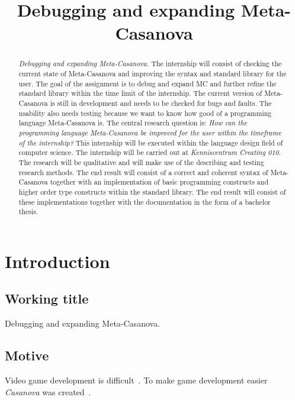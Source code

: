 



\title{Debugging and expanding Meta-Casanova}
\author{\writer}

\begin{titlepage}
   
\end{titlepage}

\begin{abstract}
   \emph{Debugging and expanding Meta-Casanova.}
   The internship will consist of checking the current state of Meta-Casanova and improving the syntax and standard library for the user.
The goal of the assignment is to debug and expand MC and further refine the standard library within the time limit of the internship.
The current version of Meta-Casanova is still in development and needs to be checked for bugs and faults.
The usability also needs testing because we want to know how good of a programming language Meta-Casanova is.
The central research question is: \emph{How can the programming language Meta-Casanova be improved for the user within the timeframe of the internship?}
This internship will be executed within the language design field of computer science.
The internship will be carried out at \emph{Kenniscentrum Creating 010}.
The research will be qualitative and will make use of the describing and testing research methods.
The end result will consist of a correct and coherent syntax of Meta-Casanova together with an implementation of basic programming constructs and higher order type constructs within the standard library.
The end result will consist of these implementations together with the documentation in the form of a bachelor thesis.
\end{abstract}

\section{Introduction}
\subsection{Working title}
Debugging and expanding Meta-Casanova.

\subsection{Motive}
Video game development is difficult~\cite{blow2004game}.
To make game development easier \emph{Casanova} was created~\cite{maggiore2011designing}.

